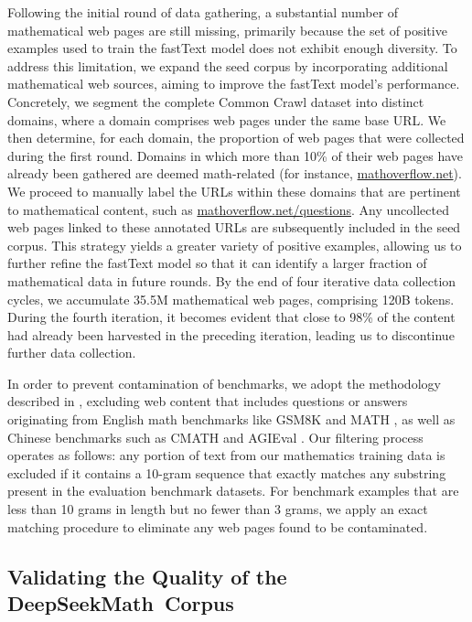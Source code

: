 \begin{itemize}[topsep=0pt]
Following the initial round of data gathering, a substantial number of mathematical web pages are still missing, primarily because the set of positive examples used to train the fastText model does not exhibit enough diversity. To address this limitation, we expand the seed corpus by incorporating additional mathematical web sources, aiming to improve the fastText model’s performance. Concretely, we segment the complete Common Crawl dataset into distinct domains, where a domain comprises web pages under the same base URL. We then determine, for each domain, the proportion of web pages that were collected during the first round. Domains in which more than 10\% of their web pages have already been gathered are deemed math-related (for instance, \url{mathoverflow.net}). 
We proceed to manually label the URLs within these domains that are pertinent to mathematical content, such as \url{mathoverflow.net/questions}. Any uncollected web pages linked to these annotated URLs are subsequently included in the seed corpus. This strategy yields a greater variety of positive examples, allowing us to further refine the fastText model so that it can identify a larger fraction of mathematical data in future rounds. By the end of four iterative data collection cycles, we accumulate 35.5M mathematical web pages, comprising 120B tokens. During the fourth iteration, it becomes evident that close to 98\% of the content had already been harvested in the preceding iteration, leading us to discontinue further data collection.

In order to prevent contamination of benchmarks, we adopt the methodology described in \cite{deepseek-coder}, excluding web content that includes questions or answers originating from English math benchmarks like GSM8K \citep{gsm8k} and MATH \citep{MATH}, as well as Chinese benchmarks such as CMATH \citep{wei2023cmath} and AGIEval \citep{agieval}. Our filtering process operates as follows: any portion of text from our mathematics training data is excluded if it contains a 10-gram sequence that exactly matches any substring present in the evaluation benchmark datasets. For benchmark examples that are less than 10 grams in length but no fewer than 3 grams, we apply an exact matching procedure to eliminate any web pages found to be contaminated.

\subsection{Validating the Quality of the DeepSeekMath~Corpus}


\end{itemize}
